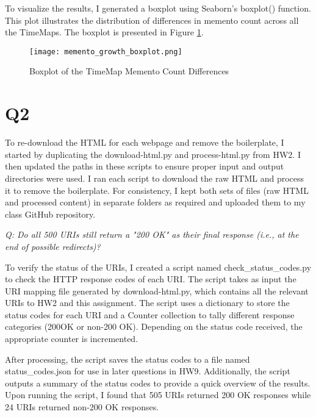 \documentclass[12pt]{article}
\begin{document}
To visualize the results, I generated a boxplot using Seaborn's boxplot() function. This plot illustrates the distribution of differences in memento count across all the TimeMaps. The boxplot is presented in  Figure \ref{fig:boxplot}.

\begin{figure}[htbp]
    \centering
    \texttt{[image: memento\_growth\_boxplot.png]}
    \caption{Boxplot of the TimeMap Memento Count Differences}
    \label{fig:boxplot}
\end{figure}


\clearpage

\section*{Q2}

To re-download the HTML for each webpage and remove the boilerplate, I started by duplicating the download-html.py and process-html.py from HW2. I then updated the paths in these scripts to ensure proper input and output directories were used. I ran each script to download the raw HTML and process it to remove the boilerplate. For consistency, I kept both sets of files (raw HTML and processed content) in separate folders as required and uploaded them to my class GitHub repository.

\emph{Q: Do all 500 URIs still return a "200 OK" as their final response (i.e., at the end of possible redirects)?}

To verify the status of the URIs, I created a script named check\_status\_codes.py to check the HTTP response codes of each URI. The script takes as input the URI mapping file generated by download-html.py, which contains all the relevant URIs to HW2 and this assignment. The script uses a dictionary to store the status codes for each URI and a Counter collection to tally different response categories (200OK or non-200 OK). Depending on the status code received, the appropriate counter is incremented.

After processing, the script saves the status codes to a file named status\_codes.json for use in later questions in HW9. Additionally, the script outputs a summary of the status codes to provide a quick overview of the results. Upon running the script, I found that 505 URIs returned 200 OK responses while 24 URIs returned non-200 OK responses.


\end{document}
